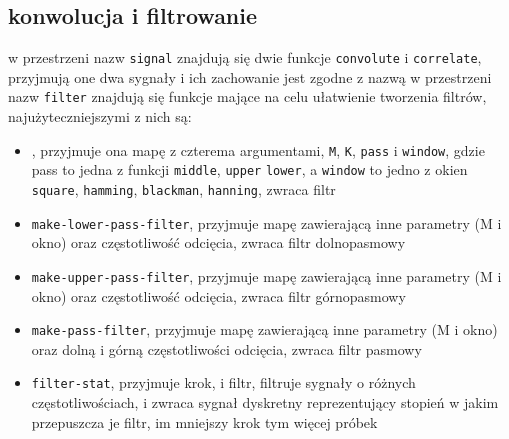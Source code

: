 \documentclass[12pt]{article}
\newcommand{\cljt}[1]{\texttt{#1}}
\begin{document}
\subsection{konwolucja i filtrowanie}
w przestrzeni nazw \cljt{signal} znajdują się dwie funkcje \cljt{convolute} i
\cljt{correlate}, przyjmują one dwa sygnały i ich zachowanie jest zgodne z nazwą
w przestrzeni nazw \cljt{filter} znajdują się funkcje mające na celu ułatwienie
tworzenia filtrów, najużyteczniejszymi z nich są:
\begin{itemize}
	\item {}, przyjmuje ona mapę z czterema argumentami, \cljt{M}, \cljt{K}, \cljt{pass}
	      i \cljt{window}, gdzie pass to jedna z funkcji \cljt{middle}, \cljt{upper}
	      \cljt{lower}, a \cljt{window} to jedno z okien \cljt{square},
	      \cljt{hamming}, \cljt{blackman}, \cljt{hanning}, zwraca filtr
	\item \cljt{make-lower-pass-filter}, przyjmuje mapę zawierającą inne parametry
	      (M i okno) oraz częstotliwość odcięcia, zwraca filtr dolnopasmowy
	\item \cljt{make-upper-pass-filter}, przyjmuje mapę zawierającą inne parametry
	      (M i okno) oraz częstotliwość odcięcia, zwraca filtr górnopasmowy
	\item \cljt{make-pass-filter}, przyjmuje mapę zawierającą inne parametry
	      (M i okno) oraz dolną i górną częstotliwości odcięcia, zwraca filtr pasmowy
	\item \cljt{filter-stat}, przyjmuje krok, i filtr, filtruje
	      sygnały o różnych częstotliwościach, i zwraca sygnał dyskretny
	      reprezentujący stopień w jakim przepuszcza je filtr, im mniejszy krok
	      tym więcej próbek
\end{itemize}
\newpage
\cite{instrukcja}
\renewcommand\refname{Bibliografia}


\end{document}
